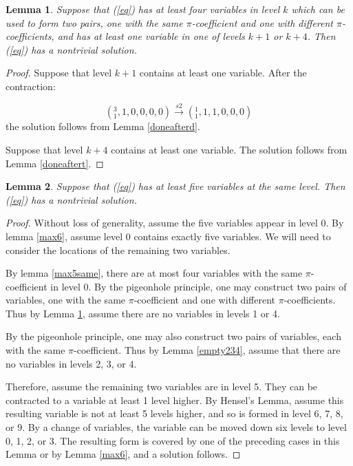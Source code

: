 \documentclass{article}
\newtheorem{lemma}{Lemma}
\begin{document}
\begin{lemma} \label{empty14}
Suppose that (\ref{eq}) has at least four variables in level $k$ which can be used to form two pairs, one with the same $\pi$-coefficient and one with different $\pi$-coefficients, and has at least one variable in one of levels $k+1$ or $k+4$.  Then (\ref{eq}) has a nontrivial solution.
\end{lemma}
\begin{proof}
Suppose that level $k+1$ contains at least one variable.  After the contraction:

$$({}^{3}_{1},1,0,0,0,0) \xrightarrow{s2}
({}^{1}_{1},1,1,0,0,0)$$
the solution follows from Lemma \ref{doneafterd}.

Suppose that level $k+4$ contains at least one variable.  The solution follows from Lemma \ref{doneaftert}.
\end{proof}


\begin{lemma} \label{max5}
Suppose that (\ref{eq}) has at least five variables at the same level.  Then (\ref{eq}) has a nontrivial solution.
\end{lemma}
\begin{proof}
Without loss of generality, assume the five variables appear in level 0.  By lemma \ref{max6}, assume level 0 contains exactly five variables.  We will need to consider the locations of the remaining two variables.

By lemma \ref{max5same}, there are at most four variables with the same $\pi$-coefficient in level 0.  By the pigeonhole principle, one may construct two pairs of variables, one with the same $\pi$-coefficient and one with different $\pi$-coefficients.  Thus by Lemma \ref{empty14}, assume there are no variables in levels 1 or 4.

By the pigeonhole principle, one may also construct two pairs of variables, each with the same $\pi$-coefficient.  Thus by Lemma \ref{empty234}, assume that there are no variables in levels 2, 3, or 4.

Therefore, assume the remaining two variables are in level 5.  They can be contracted to a variable at least 1 level higher.  By Hensel's Lemma, assume this resulting variable is not at least 5 levels higher, and so is formed in level 6, 7, 8, or 9.  By a change of variables, the variable can be moved down six levels to level 0, 1, 2, or 3.  The resulting form is covered by one of the preceding cases in this Lemma or by Lemma \ref{max6}, and a solution follows.
\end{proof}
\end{document}
